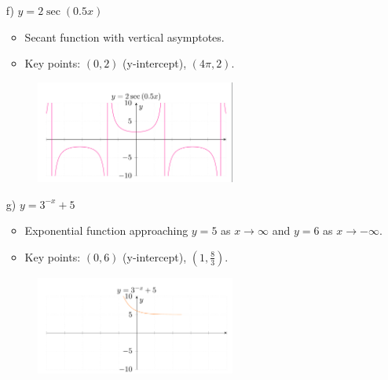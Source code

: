 \documentclass{article}
\newenvironment{solution}{\color{solutioncolor}}{}
\begin{document}
\begin{enumerate}
\begin{solution}
    \end{solution}
    \item[f)] \( y = 2\sec(0.5x) \)
    \begin{solution}
       \begin{itemize}
           \item Secant function with vertical asymptotes.
           \item Key points: \((0, 2)\) (y-intercept), \((4\pi, 2)\).
       \end{itemize}
\begin{figure}[h]
    \centering
    \includegraphics[width=0.62\textwidth]{imgs/imgs FSE/y=2sec(0.5x).png}
    \label{fig:image}
\end{figure}       
    \end{solution}
    \item[g)] \( y = 3^{-x} + 5 \)
    \begin{solution}
       \begin{itemize}
           \item Exponential function approaching \( y = 5 \) as \( x \to \infty \) and \( y = 6 \) as \( x \to -\infty \).
           \item Key points: \((0, 6)\) (y-intercept), \((1, \frac{8}{3})\).
       \end{itemize}
\begin{figure}[h]
    \centering
    \includegraphics[width=0.62\textwidth]{imgs/imgs FSE/y=3x^-x+5.png}
    \label{fig:image}
\end{figure}       
    \end{solution}

\end{enumerate}
\end{document}
